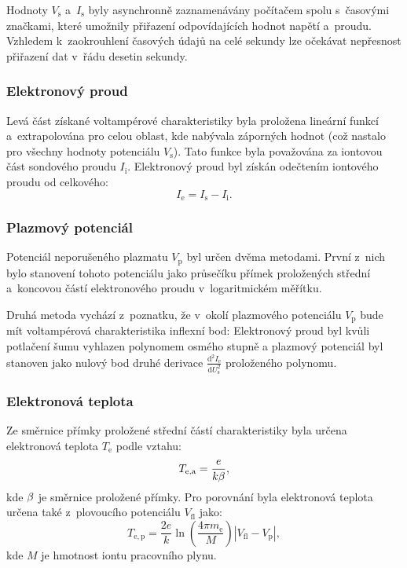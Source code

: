 \documentclass{protokol}
\newcommand\elemcharge{e}
\newcommand\boltzmann{k}
\newcommand\masselec{m_\mathrm{e}}
\newcommand\iprobe{I_\mathrm{s}}
\newcommand\iion{I_\mathrm{i}}
\newcommand\ielec{I_\mathrm{e}}
\newcommand\flpot{V_\mathrm{fl}}
\newcommand\plpot{V_\mathrm{p}}
\newcommand\potprobe{V_\mathrm{s}}
\newcommand\uprobe{U_\mathrm{s}}
\newcommand\didu{\frac{\mathrm d^2 \ielec}{\mathrm d \uprobe^2}}
\newcommand\tempelec{T_\mathrm{e}}
\newcommand\tempeleca{T_\mathrm{e,a}}
\newcommand\tempelecp{T_\mathrm{e,p}}
\newcommand\massion{M}
\begin{document}
Hodnoty $\potprobe$ a~$\iprobe$ byly asynchronně zaznamenávány počítačem
spolu s~časovými značkami, které umožnily přiřazení odpovídajících hodnot
napětí a~proudu.
Vzhledem k~zaokrouhlení časových údajů na celé sekundy lze očekávat
nepřesnost přiřazení dat v~řádu desetin sekundy.

\subsubsection{Elektronový proud}
Levá část získané voltampérové charakteristiky byla proložena lineární funkcí
a~extrapolována pro celou oblast, kde nabývala záporných hodnot
(což nastalo pro všechny hodnoty potenciálu $\potprobe$).
Tato funkce byla považována za iontovou část sondového proudu $\iion$.
Elektronový proud byl získán odečtením iontového proudu od celkového:
\begin{equation}
	\label{eq:ielec}
	\ielec = \iprobe - \iion.
\end{equation}

\subsubsection{Plazmový potenciál}
Potenciál neporušeného plazmatu $\plpot$ byl určen dvěma metodami.
První z~nich bylo stanovení tohoto potenciálu jako průsečíku přímek
proložených střední a~koncovou částí elektronového proudu v~logaritmickém
měřítku.

Druhá metoda vychází z~poznatku, že v~okolí plazmového potenciálu $\plpot$
bude mít voltampérová charakteristika inflexní bod:
Elektronový proud byl kvůli potlačení šumu vyhlazen polynomem osmého stupně
a plazmový potenciál byl stanoven jako nulový bod druhé derivace $\didu$
proloženého polynomu.

\subsubsection{Elektronová teplota}
Ze směrnice přímky proložené střední částí charakteristiky byla určena
elektronová teplota $\tempelec$ podle vztahu:
\begin{equation}
	\label{eq:tempeleca}
	\tempeleca = \frac{\elemcharge}{\boltzmann \slopeb},
\end{equation}
kde $\beta$ je směrnice proložené přímky.
%
Pro porovnání byla elektronová teplota určena také z~plovoucího potenciálu
$\flpot$ jako:
\begin{equation}
	\label{eq:tempelecp}
	\tempelecp = \frac{2\elemcharge}{\boltzmann}
		\ln\left(\frac{4\pi\masselec}{\massion}\right)
		|\flpot - \plpot|,
\end{equation}
kde $\massion$ je hmotnost iontu pracovního plynu.
\end{document}
